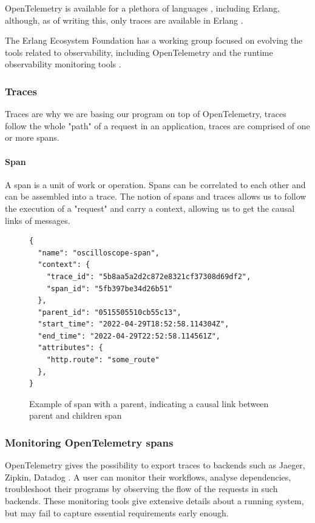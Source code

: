    OpenTelemetry is available for a plethora of languages \cite{otel-l}, including Erlang, although, as of writing this, only traces are available in Erlang \cite{otel-in}.
     
    The Erlang Ecosystem Foundation has a working group focused on evolving the tools related to observability, including OpenTelemetry and the runtime observability monitoring tools \cite{obs-group}. 
    
    \subsubsection{Traces}
        Traces are why we are basing our program on top of OpenTelemetry, traces follow the whole "path" of a request in an application, traces are comprised of one or more spans.
        
        \paragraph{Span} A span is a unit of work or operation. Spans can be correlated to each other and can be assembled into a trace.
    The notion of spans and traces allows us to follow the execution of a "request" and carry a context, allowing us to get the causal links of messages. \cite{otel-t} 
    \begin{figure}[H]
    \begin{verbatim} 
{
  "name": "oscilloscope-span",
  "context": {
    "trace_id": "5b8aa5a2d2c872e8321cf37308d69df2",
    "span_id": "5fb397be34d26b51"
  },
  "parent_id": "0515505510cb55c13",
  "start_time": "2022-04-29T18:52:58.114304Z",
  "end_time": "2022-04-29T22:52:58.114561Z",
  "attributes": {
    "http.route": "some_route"
  },
}
    \end{verbatim}

    \caption{Example of span with a parent, indicating a causal link between parent and children span \cite{otel-t}}

    \end{figure}

    \subsubsection{Monitoring OpenTelemetry spans}
            OpenTelemetry gives the possibility to export traces to backends such as Jaeger, Zipkin, Datadog \cite{otel-exp}. A user can monitor their workflows, analyse dependencies, troubleshoot their programs by observing the flow of the requests in such backends\cite{jg}. These monitoring tools give extensive details about a running system, but may fail to capture essential requirements early enough.
        
